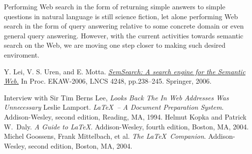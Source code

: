 \documentclass[12pt,a4]{article}
\begin{document}
Performing Web search in the form of returning simple answers to simple questions in natural language is still science fiction, let alone performing Web search in the form of query answering relative to some concrete domain or even general query answering. However, with the current activities towards semantic search on the Web, we are moving one step closer to making such desired enviroment.
\begin{thebibliography}{9}
 Y. Lei, V. S. Uren, and E. Motta. \href{http://citeseerx.ist.psu.edu/viewdoc/download?doi=10.1.1.98.3235\&rep=rep1\&type=pdf}{
\textit{ SemSearch: A search engine for the Semantic Web.}} In Proc. EKAW-2006, LNCS 4248, pp.238--245. Springer, 2006.

 Interview with Sir Tim Berns Lee, \textit{Looks Back The In Web Addresses Was Unnecessary}
 Leslie Lamport. \textit{\LaTeX\ -- A Document
Preparation System}. Addison-Wesley, second edition, Reading, MA, 1994.
 Helmut Kopka and Patrick W.~Daly. \textit{A Guide
to \LaTeX}. Addison-Wesley, fourth edition, Boston, MA, 2004.
 Michel Goossens, Frank Mittelbach, et al. \textit{The
\LaTeX\ Companion}. Addison-Wesley, second edition, Boston, MA, 2004.
\end{thebibliography}
\end{document}
